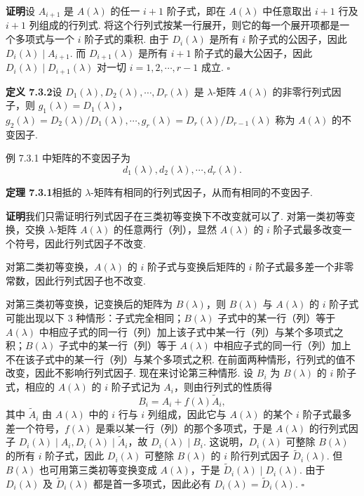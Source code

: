 \documentclass[UTF8,12pt,a4paper,fontset=fandol]{ctexart}
\begin{document}
\noindent\textbf{证明}\quad 设 $A_{i+1}$ 是 $A(\lambda)$ 的任一 $i+1$ 阶子式，即在 $A(\lambda)$ 中任意取出 $i+1$ 行及 $i+1$ 列组成的行列式. 将这个行列式按某一行展开，则它的每一个展开项都是一个多项式与一个 $i$ 阶子式的乘积. 由于 $D_i(\lambda)$ 是所有 $i$ 阶子式的公因子，因此 $D_i(\lambda)\mid A_{i+1}$. 而 $D_{i+1}(\lambda)$ 是所有 $i+1$ 阶子式的最大公因子，因此 $D_i(\lambda)\mid D_{i+1}(\lambda)$ 对一切 $i=1,2,\cdots,r-1$ 成立. $\square$

\noindent\textbf{定义 7.3.2}\quad 设 $D_1(\lambda),D_2(\lambda),\cdots,D_r(\lambda)$ 是 $\lambda$-矩阵 $A(\lambda)$ 的非零行列式因子，则 $g_1(\lambda)=D_1(\lambda)$，$g_2(\lambda)=D_2(\lambda)/D_1(\lambda),\cdots,g_r(\lambda)=D_r(\lambda)/D_{r-1}(\lambda)$ 称为 $A(\lambda)$ 的不变因子.

例 7.3.1 中矩阵的不变因子为
\[
d_1(\lambda),d_2(\lambda),\cdots,d_r(\lambda).
\]

\noindent\textbf{定理 7.3.1}\quad 相抵的 $\lambda$-矩阵有相同的行列式因子，从而有相同的不变因子.

\noindent\textbf{证明}\quad 我们只需证明行列式因子在三类初等变换下不改变就可以了. 对第一类初等变换，交换 $\lambda$-矩阵 $A(\lambda)$ 的任意两行（列），显然 $A(\lambda)$ 的 $i$ 阶子式最多改变一个符号，因此行列式因子不改变.

对第二类初等变换，$A(\lambda)$ 的 $i$ 阶子式与变换后矩阵的 $i$ 阶子式最多差一个非零常数，因此行列式因子也不改变.

对第三类初等变换，记变换后的矩阵为 $B(\lambda)$，则 $B(\lambda)$ 与 $A(\lambda)$ 的 $i$ 阶子式可能出现以下 3 种情形：子式完全相同；$B(\lambda)$ 子式中的某一行（列）等于 $A(\lambda)$ 中相应子式的同一行（列）加上该子式中某一行（列）与某个多项式之积；$B(\lambda)$ 子式中的某一行（列）等于 $A(\lambda)$ 中相应子式的同一行（列）加上不在该子式中的某一行（列）与某个多项式之积. 在前面两种情形，行列式的值不改变，因此不影响行列式因子. 现在来讨论第三种情形. 设 $B_i$ 为 $B(\lambda)$ 的 $i$ 阶子式，相应的 $A(\lambda)$ 的 $i$ 阶子式记为 $A_i$，则由行列式的性质得
\begin{equation}
B_i=A_i+f(\lambda)\widetilde{A}_i,
\tag{7.3.2}
\end{equation}
其中 $\widetilde{A}_i$ 由 $A(\lambda)$ 中的 $i$ 行与 $i$ 列组成，因此它与 $A(\lambda)$ 的某个 $i$ 阶子式最多差一个符号，$f(\lambda)$ 是乘以某一行（列）的那个多项式，于是 $A(\lambda)$ 的行列式因子 $D_i(\lambda)\mid A_i,D_i(\lambda)\mid \widetilde{A}_i$，故 $D_i(\lambda)\mid B_i$. 这说明，$D_i(\lambda)$ 可整除 $B(\lambda)$ 的所有 $i$ 阶子式，因此 $D_i(\lambda)$ 可整除 $B(\lambda)$ 的 $i$ 阶行列式因子 $\widetilde{D}_i(\lambda)$. 但 $B(\lambda)$ 也可用第三类初等变换变成 $A(\lambda)$，于是 $\widetilde{D}_i(\lambda)\mid D_i(\lambda)$. 由于 $D_i(\lambda)$ 及 $\widetilde{D}_i(\lambda)$ 都是首一多项式，因此必有 $D_i(\lambda)=\widetilde{D}_i(\lambda)$. $\square$
\end{document}
